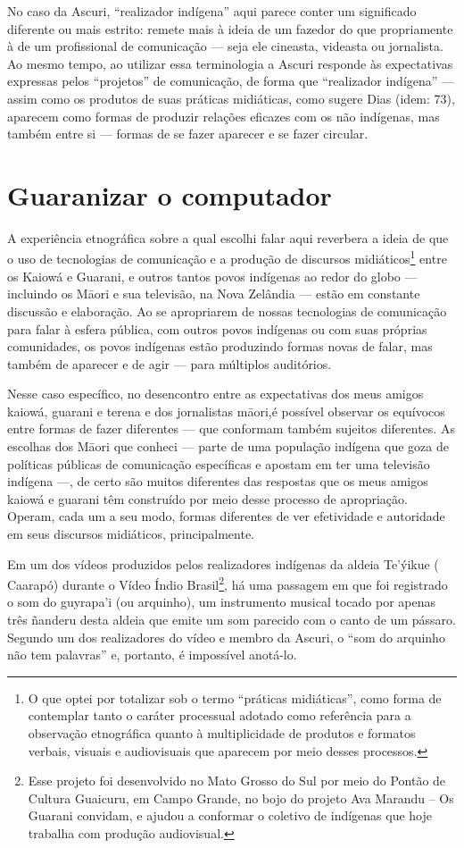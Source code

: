 {{No caso da Ascuri, ``realizador indígena'' aqui parece conter um
significado diferente ou mais estrito: remete mais à ideia de um
fazedor do que propriamente à de um profissional de comunicação --- seja
ele cineasta, videasta ou jornalista. Ao mesmo tempo, ao utilizar essa
terminologia a Ascuri responde às expectativas expressas pelos
``projetos'' de comunicação, de forma que ``realizador indígena'' --- assim
como os produtos de suas práticas midiáticas, como sugere Dias (idem:
73), aparecem como formas de produzir relações eficazes com os não
indígenas, mas também entre si --- formas de se fazer aparecer e se fazer
circular.


\section{Guaranizar o computador}

A experiência etnográfica sobre a qual escolhi falar aqui reverbera a
ideia de que o uso de tecnologias de comunicação e a produção de
discursos midiáticos\footnote{O que optei por totalizar sob o termo
``práticas midiáticas'', como forma de contemplar tanto o caráter
processual adotado como referência para a observação etnográfica quanto
à multiplicidade de produtos e formatos verbais, visuais e audiovisuais
que aparecem por meio desses processos.} entre os Kaiowá e Guarani, e
outros tantos povos indígenas ao redor do globo --- incluindo os M\=aori
e sua televisão, na Nova Zelândia --- estão em constante discussão e
elaboração. Ao se apropriarem de nossas tecnologias de comunicação para
falar à esfera pública, com outros povos indígenas ou com suas próprias
comunidades, os povos indígenas estão produzindo formas novas de falar,
mas também de aparecer e de agir --- para múltiplos auditórios.

Nesse caso específico, no desencontro entre as expectativas dos meus
amigos kaiowá, guarani e terena e dos jornalistas m\=aori,é possível observar os
equívocos entre formas de fazer diferentes --- que conformam também
sujeitos diferentes. As escolhas dos M\=aori que conheci --- parte de uma
população indígena que goza de políticas públicas de comunicação
específicas e apostam em ter uma televisão indígena ---, de certo são
muitos diferentes das respostas que os meus amigos kaiowá e guarani têm
construído por meio desse processo de apropriação. Operam, cada um a
seu modo, formas diferentes de ver efetividade e autoridade em seus
discursos midiáticos, principalmente.

Em um dos vídeos produzidos pelos realizadores indígenas da aldeia
Te’ýikue ( Caarapó) durante o Vídeo Índio Brasil\footnote{Esse
projeto foi desenvolvido no Mato Grosso do Sul por meio do Pontão de
Cultura Guaicuru, em Campo Grande, no bojo do projeto Ava Marandu – Os
Guarani convidam, e ajudou a conformar o coletivo de indígenas que hoje
trabalha com produção audiovisual.  }, há uma passagem em que foi
registrado o som do guyrapa’i (ou arquinho), um instrumento musical
tocado por apenas três ñanderu desta aldeia que emite um som parecido
com o canto de um pássaro. Segundo um dos realizadores do vídeo e
membro da Ascuri, o ``som do arquinho não tem palavras'' e, portanto, é
impossível anotá-lo.

}}
